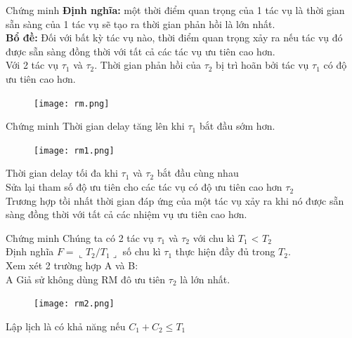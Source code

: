 \documentclass{beamer}
\begin{document}
\begin{frame}{Chứng minh}
\textbf{Định nghĩa:} một thời điểm quan trọng của 1 tác vụ là thời gian sẵn sàng của 1 tác vụ sẽ tạo ra thời gian phản hồi là lớn nhất. \\ 
\textbf{Bổ đề:} Đối với bất kỳ tác vụ nào, thời điểm quan trọng xảy ra nếu tác vụ đó được sẵn sàng đồng thời với tất cả các tác vụ ưu tiên cao hơn. \\
Với 2 tác vụ $\tau_1$ và $\tau_2$. Thời gian phản hồi của $\tau_2$ bị trì hoãn bởi tác vụ $\tau_1$ có độ ưu tiên cao hơn. 
\begin{figure}[h]
\begin{center}
\texttt{[image: rm.png]}
\end{center}
\end{figure}
\end{frame}
\begin{frame}{Chứng minh}
Thời gian delay tăng lên khi $\tau_1$ bắt đầu sớm hơn.
\begin{figure}[h]
\begin{center}
\texttt{[image: rm1.png]}
\end{center}
\end{figure}
Thời gian delay tối đa khi $\tau_1$ và $\tau_2$ bắt đầu cùng nhau \\
Sửa lại tham số độ ưu tiên cho các tác vụ có độ ưu tiên cao hơn $\tau_2$ \\
Trương hợp tồi nhất thời gian đáp ứng của một tác vụ xảy ra khi nó được sẵn sàng đồng thời với tất cả các nhiệm vụ ưu tiên cao hơn.
\end{frame}
\begin{frame}{Chứng minh}
Chúng ta có 2 tác vụ $\tau_1$ và $\tau_2$ với chu kì $T_1$ < $T_2$ \\
Định nghĩa $F = \llcorner T_2/T_1 \lrcorner$ số chu kì $\tau_1$ thực hiện đầy đủ trong $T_2$. \\
Xem xét 2 trường hợp A và B: \\
A Giả sử không dùng RM đô ưu tiên $\tau_2$ là lớn nhất.
\begin{figure}[h]
\begin{center}
\texttt{[image: rm2.png]}
\end{center}
\end{figure}
Lập lịch là có khả năng nếu $C_1 + C_2 \leq T_1$
\end{frame}
\end{document}
